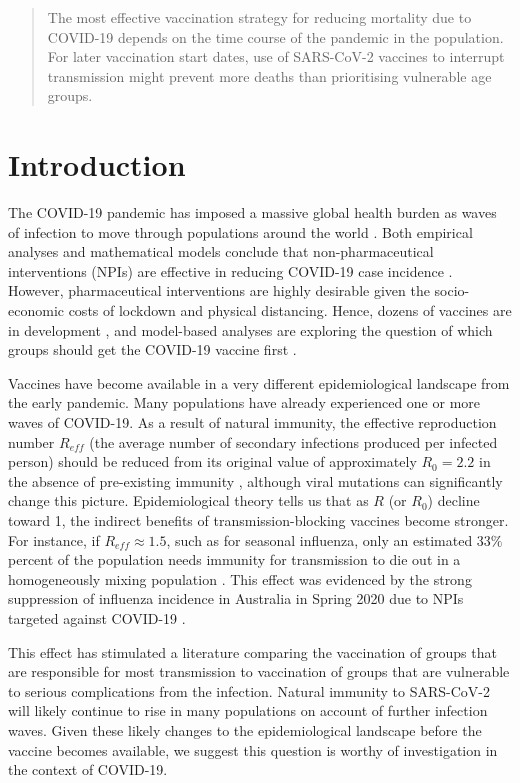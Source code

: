 \begin{abstract}
The most effective vaccination strategy for reducing mortality due to COVID-19 depends on the time course of the pandemic in the population. For later vaccination start dates, use of SARS-CoV-2 vaccines to interrupt transmission might prevent more deaths than prioritising vulnerable age groups.

\end{abstract}


\section{Introduction}


The COVID-19 pandemic has imposed a massive global health burden as waves of infection to move through populations around the world \cite{miller2020disease}.  Both empirical analyses and mathematical models conclude that non-pharmaceutical interventions (NPIs) are effective in reducing COVID-19 case incidence \cite{anderson2020estimating,peak2020individual,tuite2020mathematical}.  However, pharmaceutical interventions are highly desirable given the socio-economic costs of lockdown and physical distancing.  Hence, dozens of vaccines are  in development \cite{lurie2020developing}, and  model-based analyses are exploring the question of which groups should get the COVID-19 vaccine first \cite{bubar2020model,hoyt2020vaccine}.  


 Vaccines have become available in a very different epidemiological landscape from the early pandemic. Many populations have already experienced one or more waves of COVID-19.  As a result of natural immunity, the effective reproduction number $R_{eff}$ (the average number of secondary infections produced per infected person) should be reduced from its original value of approximately $R_0 = 2.2$ in the absence of pre-existing immunity \cite{hilton2020estimation}, although viral mutations can significantly change this picture. Epidemiological theory tells us that as $R$ (or $R_0$) decline toward 1, the indirect benefits of transmission-blocking vaccines become stronger.  For instance, if $R_{eff} \approx 1.5$, such as for seasonal influenza, only an estimated $33 \%$ percent of the population needs immunity for transmission to die out in a homogeneously mixing population  \cite{anderson1992infectious,dushoff2007vaccinating}.  This effect was evidenced by the strong suppression of influenza incidence in Australia in Spring 2020 due to NPIs targeted against COVID-19 \cite{aussie2020}. 

This effect has stimulated a literature comparing the vaccination of groups that are responsible for most transmission to vaccination of groups that are vulnerable to serious complications from the infection. Natural immunity to SARS-CoV-2 will likely continue to rise in many populations on account of further infection waves. Given these likely changes to the epidemiological landscape before the vaccine becomes available, we suggest this question is worthy of investigation in the context of COVID-19. 



